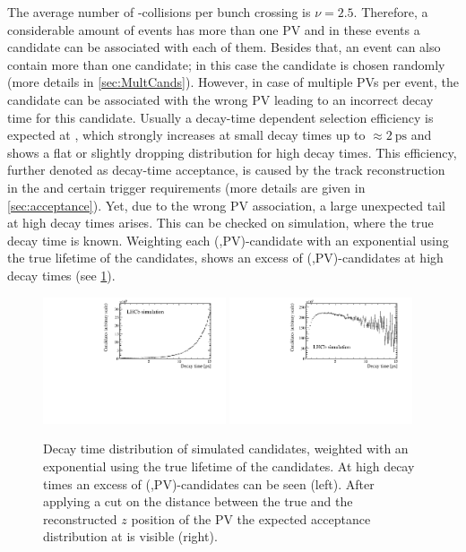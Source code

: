 The average number of \proton\proton-collisions per bunch crossing is $\nu=2.5$.
Therefore, a considerable amount of events has more than one \ac{PV} and in these events a \Bz candidate can be associated with each of them.
Besides that, an event can also contain more than one \Bz candidate; in this case the \Bz candidate is chosen randomly (more details in \cref{sec:MultCands}).
However, in case of multiple \ac{PV}s per event, the \Bz candidate can be associated with the wrong PV leading to an incorrect decay time for this candidate.
Usually a decay-time dependent selection efficiency is expected at \lhcb, which strongly increases at small decay times up to $\approx\SI{2}{\pico\second}$ and shows a flat or slightly dropping distribution for high decay times.
This efficiency, further denoted as decay-time acceptance, is caused by the track reconstruction in the \velo and certain trigger requirements (more details are given in \cref{sec:acceptance}).
Yet, due to the wrong \ac{PV} association, a large unexpected tail at high decay times arises.
This can be checked on simulation, where the true decay time is known.
Weighting each (\Bz,\ac{PV})-candidate with an exponential using the true lifetime of the \Bz candidates, shows an excess of (\Bz,\ac{PV})-candidates at high decay times (see \cref{fig:WrongPVMC}).
\begin{figure}[tbp]
    \centering
    \includegraphics[width=0.48\textwidth]{06selection/figs/WrongPVs-weightedBad.pdf}
    \includegraphics[width=0.48\textwidth]{06selection/figs/WrongPVs-weightedGoodMC.pdf}
    \caption{Decay time distribution of simulated \BdToDpi candidates, weighted with an exponential using the true lifetime of the \Bz candidates.
    At high decay times an excess of (\Bz,\ac{PV})-candidates can be seen (left).
    After applying a cut on the distance between the true and the reconstructed $z$ position of the \ac{PV} the expected acceptance distribution at \lhcb is visible (right).}
    \label{fig:WrongPVMC}
\end{figure}
